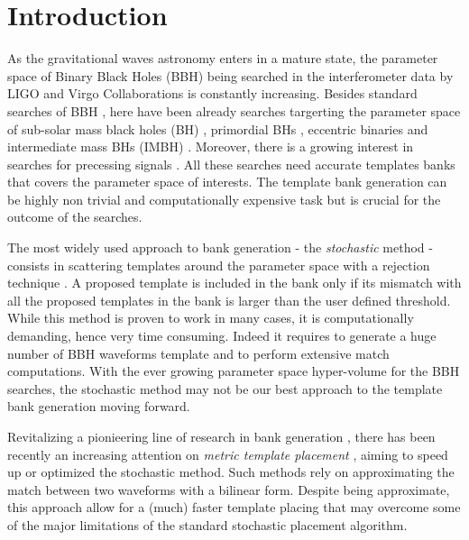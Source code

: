 \documentclass[twocolumn,showpacs,preprintnumbers,nofootinbib,prd,
superscriptaddress,10pt]{revtex4-2}
\begin{document}
\section{Introduction}

As the gravitational waves astronomy enters in a mature state, the parameter space of Binary Black Holes (BBH) being searched in the interferometer data by LIGO \cite{LIGOScientific:2014pky} and Virgo \cite{VIRGO:2014yos} Collaborations is constantly increasing. Besides standard searches of BBH \cite{GWTC-1,GWTC-2,GWTC-2.1, GWTC-3}, here have been already searches targerting the parameter space of sub-solar mass black holes (BH) \cite{SSM_O2, SSM_O3a, PhysRevD.106.023024}, primordial BHs \cite{PBH}, eccentric binaries \cite{PhysRevD.102.043005, PhysRevD.104.104016, Nitz:2019spj} and intermediate mass BHs (IMBH) \cite{IMBH_O2, IMBH_O3, Chandra:2022ixv}. Moreover, there is a growing interest in searches for precessing signals \cite{PhysRevD.89.024010, PhysRevD.97.023004, PhysRevD.102.041302, Indik:2016qky}.
All these searches need accurate templates banks that covers the parameter space of interests. The template bank generation can be highly non trivial and computationally expensive task but is crucial for the outcome of the searches.

The most widely used approach to bank generation - the {\it stochastic} method \cite{PhysRevD.80.104014} - consists in scattering templates around the parameter space with a rejection technique \cite{sbank}. A proposed template is included in the bank only if its mismatch with all the proposed templates in the bank is larger than the user defined threshold.
While this method is proven to work in many cases, it is computationally demanding, hence very time consuming. Indeed it requires to generate a huge number of BBH waveforms template and to perform extensive match computations.
With the ever growing parameter space hyper-volume for the BBH searches, the stochastic method may not be our best approach to the template bank generation moving forward.

Revitalizing a pionieering line of research in bank generation \cite{owen_metric, Messenger:2008ta}, there has been recently an increasing attention on {\it metric template placement} \cite{Roy:2017oul, 2018cosp...42E2899R, Coogan:2022qxs, Hanna:2022zpk}, aiming to speed up or optimized the stochastic method.
Such methods rely on approximating the match between two waveforms with a bilinear form. Despite being approximate, this approach allow for a (much) faster template placing that may overcome some of the major limitations of the standard stochastic placement algorithm.
\end{document}
